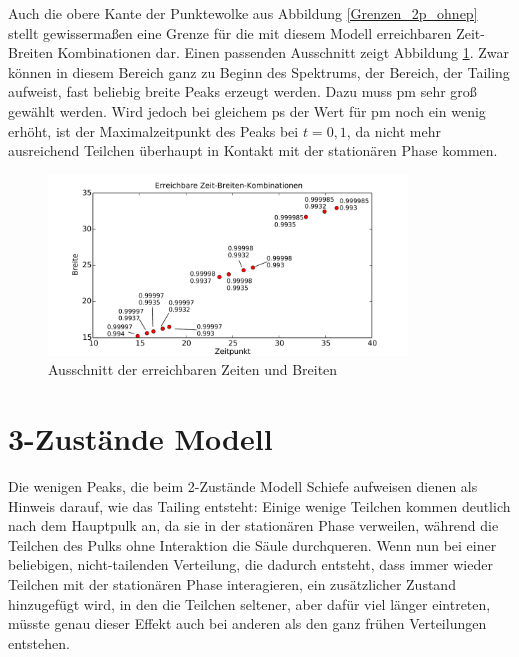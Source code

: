 Auch die obere Kante der Punktewolke aus Abbildung \ref{Grenzen_2p_ohnep} stellt gewissermaßen eine Grenze für die mit diesem Modell erreichbaren Zeit-Breiten Kombinationen dar. 
Einen passenden Ausschnitt zeigt Abbildung \ref{Grenzen_2p_ausschnitt_o}. Zwar können in diesem Bereich ganz zu Beginn des Spektrums, der Bereich, der Tailing aufweist, fast beliebig breite Peaks erzeugt werden. Dazu muss pm sehr groß gewählt werden. Wird jedoch bei gleichem ps der Wert für pm noch ein wenig erhöht, ist der Maximalzeitpunkt des Peaks bei $t=0,1$, da nicht mehr ausreichend Teilchen überhaupt in Kontakt mit der stationären Phase kommen.

\begin{figure}[h]
\centering
\includegraphics[width=0.85\textwidth]{bilder/2s_zeitbreiten_ausschnitt_o.pdf}
\caption{Ausschnitt der erreichbaren Zeiten und Breiten}
\label{Grenzen_2p_ausschnitt_o}
\end{figure}

\section{3-Zustände Modell}
Die wenigen Peaks, die beim 2-Zustände Modell Schiefe aufweisen dienen als Hinweis darauf, wie das Tailing entsteht: Einige wenige Teilchen kommen deutlich nach dem Hauptpulk an, da sie in der stationären Phase verweilen, während die Teilchen des Pulks ohne Interaktion die Säule durchqueren. 
Wenn nun bei einer beliebigen, nicht-tailenden Verteilung, die dadurch entsteht, dass immer wieder Teilchen mit der stationären Phase interagieren, ein zusätzlicher Zustand hinzugefügt wird, in den die Teilchen seltener, aber dafür viel länger eintreten, müsste genau dieser Effekt auch bei anderen als den ganz frühen Verteilungen entstehen.

